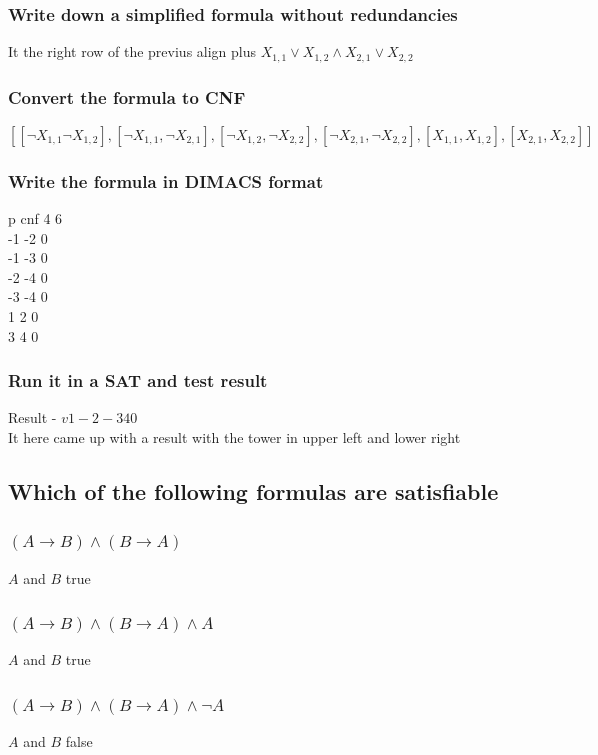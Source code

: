 \documentclass[12pt, a4paper]{article}
\begin{document}
			\subsubsection{Write down a simplified formula without redundancies}
				It the right row of the previus align plus $X_{1,1}\lor X_{1,2}\land X_{2,1}\lor X_{2,2}$
			\subsubsection{Convert the formula to CNF}
			$[[\neg X_{1,1}\neg X_{1,2}],[ \neg X_{1,1}, \neg X_{2,1} ],[ \neg X_{1,2}, \neg X_{2,2}],[\neg X_{2,1}, \neg X_{2,2}],[ X_{1,1}, X_{1,2}],[ X_{2,1}, X_{2,2}]]$
			\subsubsection{Write the formula in DIMACS format}
				p cnf 4 6\\
				-1 -2 0\\
				-1 -3 0\\
				-2 -4 0\\
				-3 -4 0\\
				1 2 0\\
				3 4 0
			\subsubsection{Run it in a SAT and test result}
			Result - $v 1 -2 -3 4 0$\\
			It here came up with a result with the tower in upper left and lower right
		\setcounter{subsection}{0}
		\subsection{Which of the following formulas are satisfiable}
			\subsubsection{$(A\rightarrow B) \land (B\rightarrow A)$}
				$A$ and $B$ true
			\subsubsection{$(A\rightarrow B) \land (B\rightarrow A)\land A$}
				$A$ and $B$ true
			\subsubsection{$(A\rightarrow B) \land (B\rightarrow A)\land \neg A$}
				$A$ and $B$ false
\end{document}
